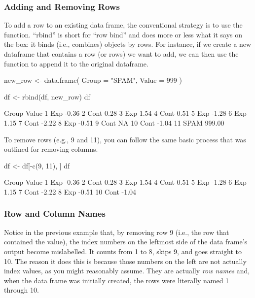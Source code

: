 \subsubsection{Adding and Removing Rows}

To add a row to an existing data frame, the conventional strategy is to use the  function. ``rbind'' is short for ``row bind'' and does more or less what it says on the box: it binds (i.e., combines) objects by rows. For instance, if we create a new dataframe that contains a row (or rows) we want to add, we can then use the  function to append it to the original dataframe.

\begin{inR}
new_row <- data.frame(
  Group = "SPAM",
  Value = 999
)
                      
df <- rbind(df, new_row)
df
\end{inR}
\begin{outR}
   Group  Value
1    Exp  -0.36
2   Cont   0.28
3    Exp   1.54
4   Cont   0.51
5    Exp  -1.28
6    Exp   1.15
7   Cont  -2.22
8    Exp  -0.51
9   Cont     NA
10  Cont  -1.04
11  SPAM 999.00
\end{outR}

To remove rows (e.g., 9 and 11), you can follow the same basic process that was outlined for removing columns.

\begin{inR}
df <- df[-c(9, 11), ]
df
\end{inR}
\begin{outR}
   Group Value
1    Exp -0.36
2   Cont  0.28
3    Exp  1.54
4   Cont  0.51
5    Exp -1.28
6    Exp  1.15
7   Cont -2.22
8    Exp -0.51
10  Cont -1.04
\end{outR}

\subsubsection{Row and Column Names}

Notice in the previous example that, by removing row 9 (i.e., the row that contained the  value), the index numbers on the leftmost side of the data frame's output become mislabelled. It counts from 1 to 8, skips 9, and goes straight to 10. The reason it does this is because those numbers on the left are not actually index values, as you might reasonably assume. They are actually \textit{row names} and, when the data frame was initially created, the rows were literally named 1 through 10.  

